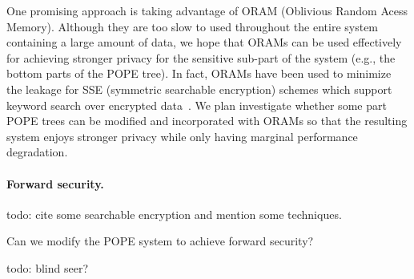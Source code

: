One promising approach is taking advantage of ORAM (Oblivious Random Acess
Memory). Although they are too slow to used throughout the entire system
containing a large amount of data, we hope that ORAMs can be used effectively
for achieving stronger privacy for the sensitive sub-part of the system (e.g.,
the bottom parts of the POPE tree).  In fact, ORAMs have been used to minimize
the leakage for SSE (symmetric searchable encryption) schemes which support
keyword search over encrypted data~\cite{NDSS:StePapShi14,C:GarMohPap16}. We
plan investigate whether some part POPE trees can be modified and incorporated
with ORAMs so that the resulting system enjoys stronger privacy while only
having marginal performance
degradation.  

\paragraph{Forward security.} todo: cite some searchable encryption and mention some techniques. 

\begin{question}
Can we modify the POPE system to achieve forward security?
\end{question}


todo: blind seer?

